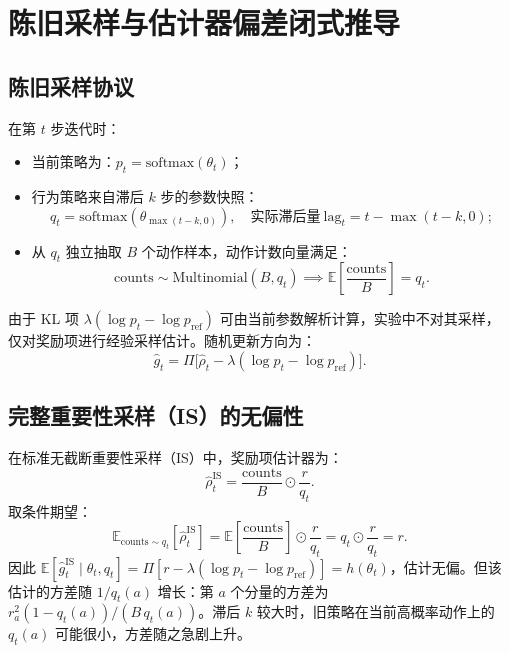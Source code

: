 \documentclass[11pt, a4paper, UTF8]{ctexart}
\begin{document}
\section{陈旧采样与估计器偏差闭式推导}

\subsection{陈旧采样协议}

在第 $t$ 步迭代时：
\begin{itemize}[leftmargin=2em]
    \item 当前策略为：$p_t = \mathrm{softmax}(\theta_t)$；
    \item 行为策略来自滞后 $k$ 步的参数快照：
    \begin{equation}
        q_t = \mathrm{softmax}(\theta_{\max(t-k, 0)}), \quad \text{实际滞后量}\ \mathrm{lag}_t = t - \max(t-k, 0);
    \end{equation}
    \item 从 $q_t$ 独立抽取 $B$ 个动作样本，动作计数向量满足：
    \begin{equation}
        \mathrm{counts} \sim \mathrm{Multinomial}(B, q_t) \implies \mathbb{E}\left[ \frac{\mathrm{counts}}{B} \right] = q_t.
    \end{equation}
\end{itemize}

由于 KL 项 $\lambda(\log p_t - \log p_{\mathrm{ref}})$ 可由当前参数解析计算，实验中不对其采样，仅对奖励项进行经验采样估计。随机更新方向为：
\begin{equation}
    \hat{g}_t = \Pi \Big[ \hat{\rho}_t - \lambda (\log p_t - \log p_{\mathrm{ref}}) \Big].
\end{equation}

\subsection{完整重要性采样（IS）的无偏性}

在标准无截断重要性采样（IS）中，奖励项估计器为：
\begin{equation}
    \hat{\rho}_t^{\mathrm{IS}} = \frac{\mathrm{counts}}{B} \odot \frac{r}{q_t}.
\end{equation}
取条件期望：
\begin{equation}
    \mathbb{E}_{\mathrm{counts} \sim q_t} \left[ \hat{\rho}_t^{\mathrm{IS}} \right] = \mathbb{E}\left[\frac{\mathrm{counts}}{B}\right] \odot \frac{r}{q_t} = q_t \odot \frac{r}{q_t} = r.
\end{equation}
因此 $\mathbb{E} [ \hat{g}_t^{\mathrm{IS}} \mid \theta_t, q_t ] = \Pi [ r - \lambda (\log p_t - \log p_{\mathrm{ref}}) ] = h(\theta_t)$，估计无偏。但该估计的方差随 $1/q_t(a)$ 增长：第 $a$ 个分量的方差为 $r_a^2 (1 - q_t(a)) / (B\, q_t(a))$。滞后 $k$ 较大时，旧策略在当前高概率动作上的 $q_t(a)$ 可能很小，方差随之急剧上升。
\end{document}
